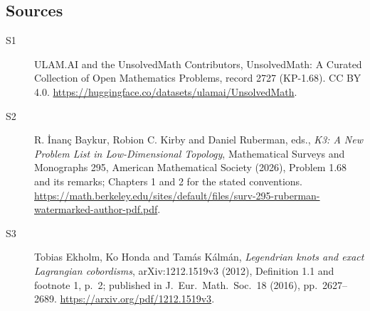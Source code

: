 \documentclass[11pt]{article}
\begin{document}
\subsection{Sources}
\begin{description}
\item[\hypertarget{source:2727:1}{S1}] ULAM.AI and the UnsolvedMath Contributors, UnsolvedMath: A Curated Collection of Open Mathematics Problems, record 2727 (KP-1.68). CC BY 4.0. \url{https://huggingface.co/datasets/ulamai/UnsolvedMath}.
\item[\hypertarget{source:2727:2}{S2}] R. İnanç Baykur, Robion C. Kirby and Daniel Ruberman, eds., \emph{K3: A New Problem List in Low-Dimensional Topology}, Mathematical Surveys and Monographs 295, American Mathematical Society (2026), Problem 1.68 and its remarks; Chapters 1 and 2 for the stated conventions. \url{https://math.berkeley.edu/sites/default/files/surv-295-ruberman-watermarked-author-pdf.pdf}.
\item[\hypertarget{source:2727:3}{S3}] Tobias Ekholm, Ko Honda and Tamás Kálmán, \emph{Legendrian knots and exact Lagrangian cobordisms}, arXiv:1212.1519v3 (2012), Definition 1.1 and footnote 1, p.\ 2; published in J.\ Eur.\ Math.\ Soc.\ 18 (2016), pp.\ 2627--2689. \url{https://arxiv.org/pdf/1212.1519v3}.
\end{description}
\label{end:2727}
\end{document}
